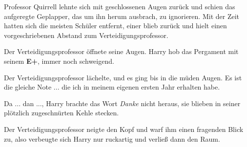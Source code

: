 Professor Quirrell lehnte sich mit geschlossenen Augen zurück und schien das
aufgeregte Geplapper, das um ihn herum ausbrach, zu ignorieren. Mit der Zeit
hatten sich die meisten Schüler entfernt, einer blieb zurück und hielt einen
vorgeschriebenen Abstand zum Verteidigungsprofessor.

Der Verteidigungsprofessor öffnete seine Augen. Harry hob das Pergament mit
seinem \textbf{E+}, immer noch schweigend.

Der Verteidigungsprofessor lächelte, und es ging bis in die müden Augen. \glqq{}
Es ist die gleiche Note ... die ich in meinem eigenen ersten Jahr erhalten
habe.\grqq{}

\glqq{}Da ... dan ...\grqq{}, Harry brachte das Wort \glqq{}\emph{Danke}\grqq{}
nicht heraus, sie blieben in seiner plötzlich zugeschnürten Kehle stecken.

Der Verteidigungsprofessor neigte den Kopf und warf ihm einen fragenden Blick
zu, also verbeugte sich Harry nur ruckartig und verließ dann den Raum.


